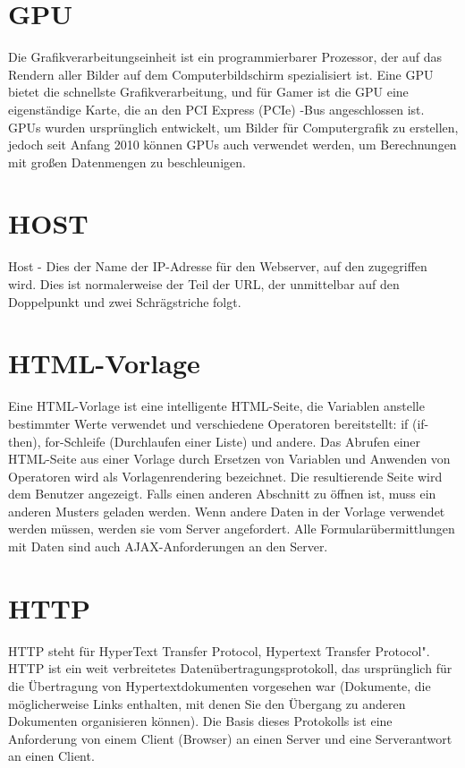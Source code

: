 \section*{GPU}
\label{sec:appendix:gpu}
Die Grafikverarbeitungseinheit ist ein programmierbarer Prozessor, der auf das Rendern aller Bilder auf dem Computerbildschirm spezialisiert ist. Eine GPU bietet die schnellste Grafikverarbeitung, und für Gamer ist die GPU eine eigenständige Karte, die an den PCI Express (PCIe) -Bus angeschlossen ist. GPUs wurden ursprünglich entwickelt, um Bilder für Computergrafik zu erstellen, jedoch seit Anfang 2010 können GPUs auch verwendet werden, um Berechnungen mit großen Datenmengen zu beschleunigen.

\section*{HOST}
\label{sec:appendix:host}
Host - Dies  der Name der IP-Adresse für den Webserver, auf den zugegriffen wird. Dies ist normalerweise der Teil der URL, der unmittelbar auf den Doppelpunkt und zwei Schrägstriche folgt.\cite[p.31]{shklar:webapplication} 

\section*{HTML-Vorlage}
\label{sec:appendix:html}
Eine HTML-Vorlage ist eine intelligente HTML-Seite, die Variablen anstelle bestimmter Werte verwendet und verschiedene Operatoren bereitstellt: if (if-then), for-Schleife (Durchlaufen einer Liste) und andere. Das Abrufen einer HTML-Seite aus einer Vorlage durch Ersetzen von Variablen und Anwenden von Operatoren wird als Vorlagenrendering bezeichnet. Die resultierende Seite wird dem Benutzer angezeigt. Falls einen anderen Abschnitt zu öffnen ist, muss ein anderen Musters geladen werden. Wenn andere Daten in der Vorlage verwendet werden müssen, werden sie vom Server angefordert. Alle Formularübermittlungen mit Daten sind auch AJAX-Anforderungen an den Server.

\section*{HTTP}
\label{sec:appendix:http}
HTTP steht für HyperText Transfer Protocol, Hypertext Transfer Protocol". HTTP ist ein weit verbreitetes Datenübertragungsprotokoll, das ursprünglich für die Übertragung von Hypertextdokumenten vorgesehen war (Dokumente, die möglicherweise Links enthalten, mit denen Sie den Übergang zu anderen Dokumenten organisieren können). Die Basis dieses Protokolls ist eine Anforderung von einem Client (Browser) an einen Server und eine Serverantwort an einen Client.

